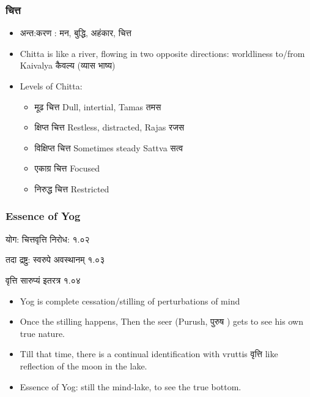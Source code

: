 \begin{frame}[fragile]\frametitle{चित्त}

	\begin{itemize}
	\item अन्त:करण : मन, बुद्धि, अहंकार, चित्त
	\item Chitta is like a river, flowing in two opposite directions: worldliness to/from Kaivalya कैवल्य (व्यास भाष्य)
	\item Levels of Chitta:
		\begin{itemize}
		\item मूढ चित्त  Dull, intertial, Tamas तमस
		\item क्षिप्त चित्त  Restless, distracted, Rajas  रजस
		\item विक्षिप्त चित्त Sometimes steady Sattva सत्व
		\item एकाग्र चित्त Focused
		\item निरुद्ध चित्त Restricted
		
		\end{itemize}	
	\end{itemize}

\end{frame}

\begin{frame}[fragile]\frametitle{Essence of Yog}

\begin{sanskrit}
योग: चित्तवृत्ति निरोध: १.०२

तदा द्रष्टु: स्वरुपे अवस्थानम् १.०३

वृत्ति सारुप्यं इतरत्र १.०४
\end{sanskrit}


	\begin{itemize}
	\item Yog is complete cessation/stilling of perturbations of mind
	\item Once the stilling happens, Then the seer (Purush, पुरुष ) gets to see his own true nature.
	\item Till that time, there is a continual identification with vruttis वृत्ति like reflection of the moon in the lake.
	\item Essence of Yog: still the mind-lake, to see the true bottom.
	\end{itemize}

\end{frame}

